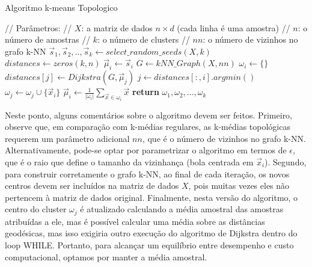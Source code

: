 \documentclass[sn-mathphys,Numbered]{sn-jnl}%
\theoremstyle{thmstyleone}%
\theoremstyle{thmstyletwo}%
\theoremstyle{thmstylethree}%
\begin{document}
\begin{algorithm}[H]
\caption{Algoritmo k-means Topologico}\label{topkmeans_algo}
\begin{algorithmic}
\State // Parâmetros:
\State // $X$: a matriz de dados $n \times d$ (cada linha é uma amostra)
\State // $n$: o número de amostras
\State // $k$: o número de clusters
\State // $nn$: o número de vizinhos no grafo k-NN
\State $\vec{s}_1, \vec{s}_2, .., \vec{s}_k \gets select\_random\_seeds(X, k)$ 
\State $distances \gets zeros(k, n)$ 
	\State $\vec{\mu}_i \gets \vec{s}_i$		
\EndFor
{}
	\State $G \gets kNN\_Graph(X, nn)$	
		\State $\omega_i \gets \{ \}$		
	\EndFor
		\State $distances[j] \gets Dijkstra(G, \vec{\mu}_j)$  
	\EndFor
		\State $j \gets distances[:, i].argmin()$	
        \State $\omega_j \gets \omega_j \cup \{ \vec{x}_i \} $	
	\EndFor
		\State $\vec{\mu}_i \gets \frac{1}{\lvert \omega_i \rvert}\sum_{\vec{x} \in \omega_i} \vec{x}$ 
	\EndFor
\EndWhile 
\State \textbf{return} $\omega_1, \omega_2, ..., \omega_k$	
\EndFunction
\end{algorithmic}
\end{algorithm}

Neste ponto, alguns comentários sobre o algoritmo devem ser feitos. Primeiro, observe que, em comparação com k-médias regulares, as k-médias topológicas requerem um parâmetro adicional $nn$, que é o número de vizinhos no grafo k-NN. Alternativamente, pode-se optar por parametrizar o algoritmo em termos de $\epsilon$, que é o raio que define o tamanho da vizinhança (bola centrada em $\vec{x}_i$). Segundo, para construir corretamente o grafo k-NN, ao final de cada iteração, os novos centros devem ser incluídos na matriz de dados $X$, pois muitas vezes eles não pertencem à matriz de dados original. Finalmente, nesta versão do algoritmo, o centro do cluster $\omega_j$ é atualizado calculando a média amostral das amostras atribuídas a ele, mas é possível calcular uma média sobre as distâncias geodésicas, mas isso exigiria outro execução do algoritmo de Dijkstra dentro do loop WHILE. Portanto, para alcançar um equilíbrio entre desempenho e custo computacional, optamos por manter a média amostral.
\end{document}
